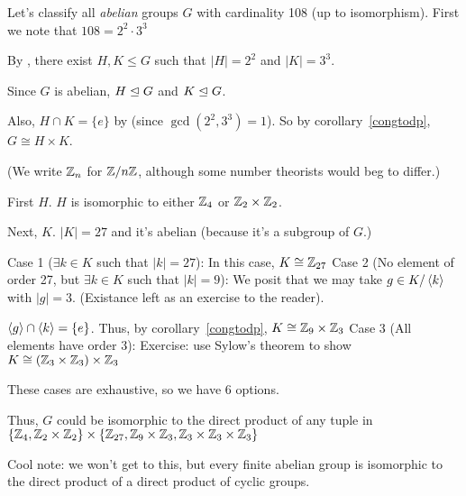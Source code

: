 \documentclass[notes.tex]{subfiles}
\begin{document}
\begin{eg}
	Let's classify all \emph{abelian} groups $G$ with cardinality 108 (up to isomorphism). First we note that $108 =2^2\cdot 3^3$

	By , there exist $H, K\le G$ such that $|H| = 2^2$ and $|K| = 3^3$.

	Since $G$ is abelian, $H\trianglelefteq G$ and $K\trianglelefteq G$.

	Also, $H\cap K = \{e\}$ by  (since $\gcd(2^2, 3^3)=1$). So by corollary~\ref{congtodp}, $G\cong H\times K$.

	(We write $\mathbb{Z}_n$ for $\mathbb{Z}/n\mathbb{Z}$, although some number theorists would beg to differ.)

	First $H$. $H$ is isomorphic to either $\mathbb{Z}_4$ or $\mathbb{Z}_2\times\mathbb{Z}_2$.

	Next, $K$. $|K| = 27$ and it's abelian (because it's a subgroup of $G$.)

	Case 1 ($\exists k\in K$ such that $|k| = 27$):
	\tabin
		In this case, $K\cong\mathbb{Z}_{27}$
	\tabout
	Case 2 (No element of order 27, but $\exists k\in K$ such that $|k| = 9$):
	\tabin
		We posit that we may take $g\in K/\left\langle{k}\right\rangle$ with $|g| = 3$. (Existance left as an exercise to the reader).

		$\left\langle{g}\right\rangle\cap \left\langle{k}\right\rangle = \{e\}$.
		Thus, by corollary~\ref{congtodp}, $K\cong \mathbb{Z}_9\times \mathbb{Z}_3$
	\tabout
	Case 3 (All elements have order 3):
	\tabin
		Exercise: use Sylow's theorem to show $K\cong (\mathbb{Z}_3\times\mathbb{Z}_3)\times\mathbb{Z}_3$
	\tabout

	These cases are exhaustive, so we have 6 options.

	Thus, $G$ could be isomorphic to the direct product of any tuple in
	$\{\mathbb{Z}_4, \mathbb{Z}_2\times\mathbb{Z}_2\} \times \{\mathbb{Z}_{27}, \mathbb{Z}_9\times \mathbb{Z}_3, \mathbb{Z}_3\times\mathbb{Z}_3\times\mathbb{Z}_3\}$
\end{eg}

Cool note: we won't get to this, but every finite abelian group is isomorphic to the direct product of a direct product of cyclic groups.
\end{document}
